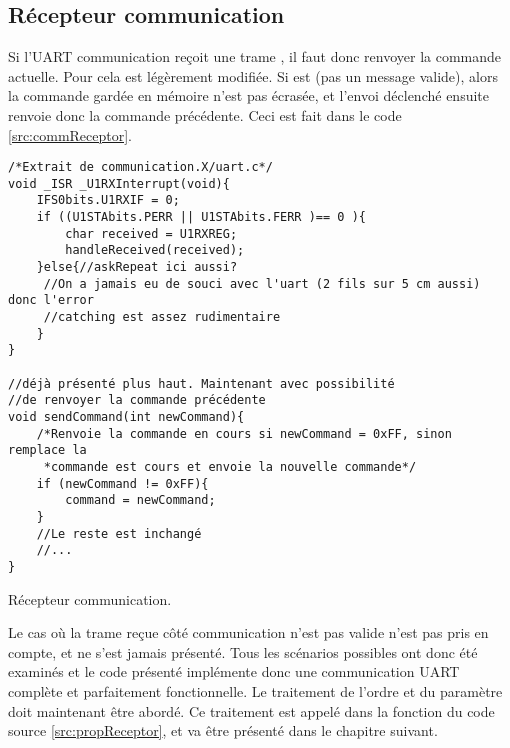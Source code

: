 \subsection{Récepteur communication}
Si l'UART communication reçoit une trame , il faut donc renvoyer la commande actuelle. Pour cela  est légèrement modifiée. Si  est  (pas un message valide), alors la commande gardée en mémoire n'est pas écrasée, et l'envoi déclenché ensuite renvoie donc la commande précédente. Ceci est fait dans le code \ref{src:commReceptor}.
\begin{listing}[htbp]
\begin{verbatim}
/*Extrait de communication.X/uart.c*/
void _ISR _U1RXInterrupt(void){
    IFS0bits.U1RXIF = 0;
    if ((U1STAbits.PERR || U1STAbits.FERR )== 0 ){
        char received = U1RXREG;
        handleReceived(received);
    }else{//askRepeat ici aussi?
     //On a jamais eu de souci avec l'uart (2 fils sur 5 cm aussi) donc l'error
     //catching est assez rudimentaire
    }
}

//déjà présenté plus haut. Maintenant avec possibilité
//de renvoyer la commande précédente
void sendCommand(int newCommand){
    /*Renvoie la commande en cours si newCommand = 0xFF, sinon remplace la
     *commande est cours et envoie la nouvelle commande*/
    if (newCommand != 0xFF){
        command = newCommand;
    }
    //Le reste est inchangé
    //...
}
\end{verbatim}
\caption{Récepteur communication.\label{src:commReceptor}}
\end{listing}
Le cas où la trame reçue côté communication n'est pas valide n'est pas pris en compte, et ne s'est jamais présenté. Tous les scénarios possibles ont donc été examinés et le code présenté implémente donc une communication UART complète et parfaitement fonctionnelle. Le traitement de l'ordre et du paramètre doit maintenant être abordé. Ce traitement est appelé dans la fonction  du code source \ref{src:propReceptor}, et va être présenté dans le chapitre suivant.
